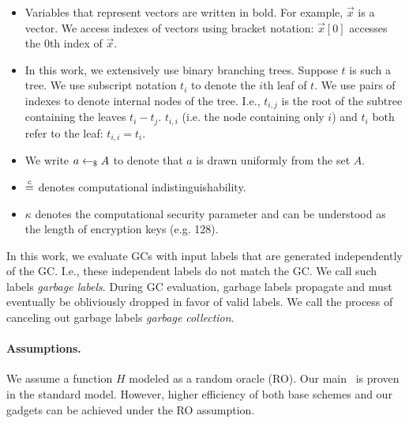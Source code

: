 \begin{itemize}
	\item Variables that represent vectors are written in bold.
	For example, $\vec{x}$ is a vector.
	We access indexes of vectors using bracket notation: $\vec{x}[0]$ accesses the $0$th index of $\vec{x}$.
\item In this work, we extensively use binary branching trees.
  Suppose $t$ is such a tree. We use subscript notation $t_i$ to denote the
  $i$th leaf of $t$.
  We use pairs of indexes to denote internal nodes of the tree.
  I.e., $t_{i, j}$ is the root of the subtree containing the leaves
  $t_i - t_j$. $t_{i,i}$ (i.e. the node
  containing only $i$) and $t_i$ both refer to the leaf: $t_{i,i} =
  t_i$.
	\item We write $a \gets_{\$} A$ to denote that $a$ is drawn
    uniformly from the set $A$.
	\item $\overset{c}{=}$ denotes computational indistinguishability.
	\item $\kappa$ denotes the computational security parameter and can be understood as the length of encryption keys (e.g. 128).
\end{itemize}

In this work, we evaluate GCs with input labels that are generated independently of the GC.
I.e., these independent labels do not match the GC.
We call such labels {\em garbage labels}.
During GC evaluation,  garbage labels propagate and must eventually  be obliviously dropped in favor of valid labels.
We call  the process of canceling out garbage labels {\em garbage collection}.

\paragraph{Assumptions.} We assume a function $H$ modeled as a random oracle (RO).  Our main~ \ourschemelong is proven in the standard model. However, higher efficiency of both base schemes and our gadgets can be achieved under the RO assumption.

